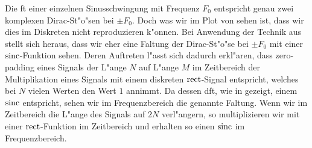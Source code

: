 Die \gls{ft} einer einzelnen Sinusschwingung mit Frequenz $F_0$ entspricht genau zwei komplexen Dirac-St"o"sen bei $\pm F_0$.
Doch was wir im Plot von  sehen ist, dass wir dies im Diskreten nicht reproduzieren k"onnen.
Bei Anwendung der Technik aus  stellt sich heraus, dass wir eher eine Faltung der Dirac-St"o"se bei $\pm F_0$ mit einer $\operatorname*{sinc}$-Funktion sehen.
Deren Auftreten l"asst sich dadurch erkl"aren, dass zero-padding eines Signals der L"ange $N$ auf L"ange $M$ im Zeitbereich der Multiplikation eines Signals mit einem diskreten $\operatorname*{rect}$-Signal entspricht, welches bei $N$ vielen Werten den Wert $1$ annimmt.
Da dessen \gls{dft}, wie in  gezeigt, einem $\operatorname*{sinc}$ entspricht, sehen wir im Frequenzbereich die genannte Faltung.
Wenn wir im Zeitbereich die L"ange des Signals auf $2N$ verl"angern, so multiplizieren wir mit einer  $\operatorname*{rect}$-Funktion im Zeitbereich und erhalten so einen  $\operatorname*{sinc}$ im Frequenzbereich.

